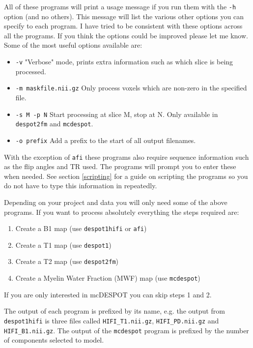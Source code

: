 \documentclass{report}
\begin{document}
All of these programs will print a usage message if you run them with the \texttt{-h} option (and no others). This message will list the various other options you can specify to each program. I have tried to be consistent with these options across all the programs. If you think the options could be improved please let me know. Some of the most useful options available are:

\begin{itemize} \itemsep1pt \parskip0pt 
	\item \texttt{-v} "Verbose" mode, prints extra information such as which slice is being processed.
	\item \texttt{-m maskfile.nii.gz} Only process voxels which are non-zero in the specified file.
	\item \texttt{-s M -p N} Start processing at slice M, stop at N. Only available in \texttt{despot2fm} and \texttt{mcdespot}.
	\item \texttt{-o prefix} Add a prefix to the start of all output filenames.
\end{itemize}

With the exception of \texttt{afi} these programs also require sequence information such as the flip angles and TR used. The programs will prompt you to enter these when needed. See section \ref{scripting} for a guide on scripting the programs so you do not have to type this information in repeatedly.

Depending on your project and data you will only need some of the above programs. If you want to process absolutely everything the steps required are:

\begin{enumerate}\itemsep1pt \parskip0pt 
	\item Create a B1 map (use \texttt{despot1hifi} or \texttt{afi})
	\item Create a T1 map (use \texttt{despot1})
	\item Create a T2 map (use \texttt{despot2fm})
	\item Create a Myelin Water Fraction (MWF) map (use \texttt{mcdespot})
\end{enumerate}

If you are only interested in mcDESPOT you can skip steps 1 and 2.

The output of each program is prefixed by its name, e.g. the output from \texttt{despot1hifi} is three files called \texttt{HIFI\_T1.nii.gz}, \texttt{HIFI\_PD.nii.gz} and \texttt{HIFI\_B1.nii.gz}. The output of the \texttt{mcdespot} program is prefixed by the number of components selected to model.
\end{document}

